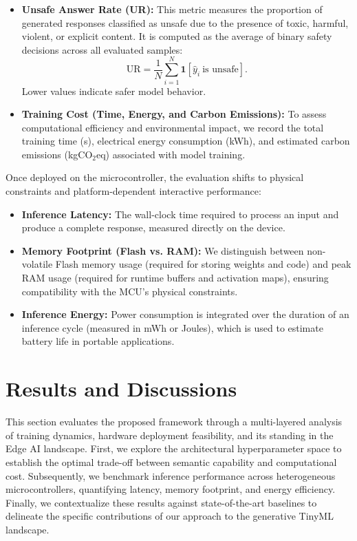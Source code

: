 \documentclass{ieeeaccess}
\begin{document}
\begin{itemize}
    \item \textbf{Unsafe Answer Rate (UR):} This metric measures the proportion of generated responses classified as unsafe due to the presence of toxic, harmful, violent, or explicit content. It is computed as the average of binary safety decisions across all evaluated samples:
    \begin{equation}
    \text{UR}=\frac{1}{N}\sum_{i=1}^{N}\mathbf{1}[\hat{y}_i\ \text{is unsafe}].
    \end{equation}
    Lower values indicate safer model behavior.

    \item \textbf{Training Cost (Time, Energy, and Carbon Emissions):} To assess computational efficiency and environmental impact, we record the total training time (s), electrical energy consumption (kWh), and estimated carbon emissions (kgCO$_2$eq) associated with model training.
\end{itemize}



Once deployed on the microcontroller, the evaluation shifts to physical constraints and platform-dependent interactive performance:

\begin{itemize}
    \item \textbf{Inference Latency:} The wall-clock time required to process an input and produce a complete response, measured directly on the device.
    \item \textbf{Memory Footprint (Flash vs. RAM):} We distinguish between non-volatile Flash memory usage (required for storing weights and code) and peak RAM usage (required for runtime buffers and activation maps), ensuring compatibility with the MCU's physical constraints.
    \item \textbf{Inference Energy:} Power consumption is integrated over the duration of an inference cycle (measured in mWh or Joules), which is used to estimate battery life in portable applications.
\end{itemize}

\section{Results and Discussions}\label{sec:results}

This section evaluates the proposed framework through a multi-layered analysis of training dynamics, hardware deployment feasibility, and its standing in the Edge AI landscape. First, we explore the architectural hyperparameter space to establish the optimal trade-off between semantic capability and computational cost. Subsequently, we benchmark inference performance across heterogeneous microcontrollers, quantifying latency, memory footprint, and energy efficiency. Finally, we contextualize these results against state-of-the-art baselines to delineate the specific contributions of our approach to the generative TinyML landscape.
\end{document}

